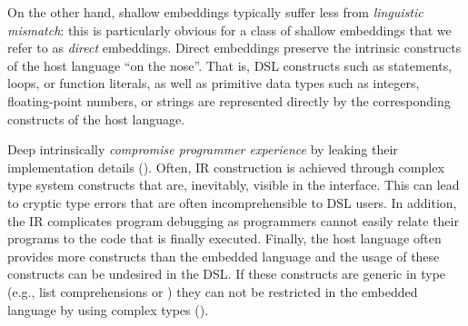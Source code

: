 
On the other hand, shallow embeddings typically suffer less from
\emph{linguistic mismatch}: this is particularly obvious for a class of shallow embeddings that we refer to as \emph{direct} embeddings. Direct embeddings preserve the intrinsic constructs of the host language ``on the nose''. That is, DSL
constructs such as  statements, loops, or function literals, as well
as primitive data types such as integers, floating-point numbers, or strings
are represented directly by the corresponding constructs of the host language.
%



Deep \edsls{} intrinsically \emph{compromise programmer experience} by leaking their
implementation details (). Often, IR construction
is achieved through complex type system constructs that are, inevitably,
visible in the \edsl interface. This can lead to cryptic type errors
that are often incomprehensible to DSL users.
In addition, the IR complicates program debugging as programmers cannot easily
relate their programs to the code that is finally executed. Finally, the host
language often provides more constructs than the embedded language and the usage
of these constructs can be undesired in the DSL. If these constructs are generic in type
(e.g., list comprehensions or ) they can not be restricted in the embedded
language by using complex types ().

